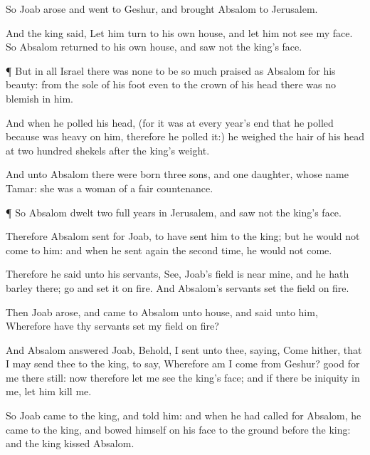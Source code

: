 {So
Joab
arose and
went to
Geshur, and
brought
Absalom to
Jerusalem.

And the
king
said, Let him
turn to his own
house, and let him not
see my
face. So
Absalom
returned to his own
house, and
saw not the
king’s
face.


\par }{\PP {}¶ But in all
Israel there was
none to be so
much
praised as
Absalom for his
beauty: from the
sole of his
foot even to the crown of his
head there was no
blemish in him.

And when he
polled his
head, (for it was at every
year’s
end that he
polled
{} because
{} was
heavy on him, therefore he
polled it:) he
weighed the
hair of his
head at two
hundred
shekels after the
king’s
weight.

And unto
Absalom there were
born
three
sons, and
one
daughter, whose
name
{}
Tamar: she was a
woman of a
fair
countenance.


\par }{\PP {}¶ So
Absalom
dwelt two
full
years in
Jerusalem, and
saw not the
king’s
face.

Therefore
Absalom
sent for
Joab, to have
sent him to the
king; but he
would not
come to him: and when he sent
again the second
time, he
would not
come.

Therefore he
said unto his
servants,
See,
Joab’s
field is
near
mine, and he hath
barley there;
go and
set it on
fire. And
Absalom’s
servants
set the
field on
fire.

Then
Joab
arose, and
came to
Absalom unto
{}
house, and
said unto him, Wherefore have thy
servants
set my
field on
fire?

And
Absalom
answered
Joab, Behold, I
sent unto thee,
saying,
Come hither, that I may
send thee to the
king, to
say, Wherefore am I
come from
Geshur?
{}
good for me
{} there still: now therefore let me
see the
king’s
face; and if there
be
{}
iniquity in me, let him
kill me.

So
Joab
came to the
king, and
told him: and when he had
called for
Absalom, he
came to the
king, and
bowed himself on his
face to the
ground
before the
king: and the
king
kissed
Absalom.




}
